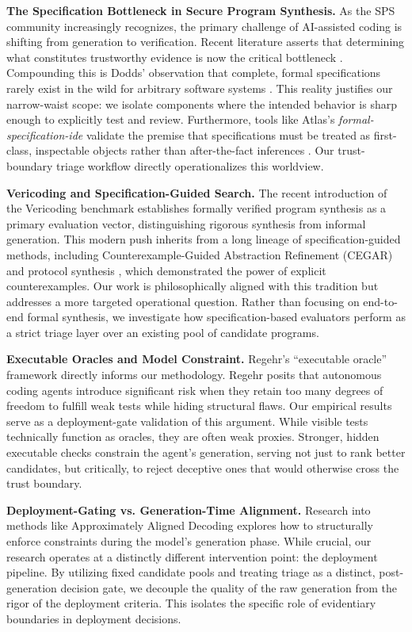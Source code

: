 \documentclass[11pt]{article}
\begin{document}
\textbf{The Specification Bottleneck in Secure Program Synthesis.}
As the SPS community increasingly recognizes, the primary challenge of AI-assisted coding is shifting from generation to verification. Recent literature asserts that determining what constitutes trustworthy evidence is now the critical bottleneck \cite{VonHippel2026SPS, Dougherty2026SPSSequence}. Compounding this is Dodds' observation that complete, formal specifications rarely exist in the wild for arbitrary software systems \cite{Dodds2025Specs}. This reality justifies our narrow-waist scope: we isolate components where the intended behavior is sharp enough to explicitly test and review. Furthermore, tools like Atlas's \textit{formal-specification-ide} validate the premise that specifications must be treated as first-class, inspectable objects rather than after-the-fact inferences \cite{Atlas2026SpecIDE}. Our trust-boundary triage workflow directly operationalizes this worldview.

\textbf{Vericoding and Specification-Guided Search.}
The recent introduction of the Vericoding benchmark \cite{Bursuc2025Vericoding} establishes formally verified program synthesis as a primary evaluation vector, distinguishing rigorous synthesis from informal generation. This modern push inherits from a long lineage of specification-guided methods, including Counterexample-Guided Abstraction Refinement (CEGAR) \cite{Clarke2003CEGAR} and protocol synthesis \cite{Alur2014Protocols}, which demonstrated the power of explicit counterexamples. Our work is philosophically aligned with this tradition but addresses a more targeted operational question. Rather than focusing on end-to-end formal synthesis, we investigate how specification-based evaluators perform as a strict triage layer over an existing pool of candidate programs.

\textbf{Executable Oracles and Model Constraint.}
Regehr's ``executable oracle'' framework \cite{Regehr2026ZeroDOF} directly informs our methodology. Regehr posits that autonomous coding agents introduce significant risk when they retain too many degrees of freedom to fulfill weak tests while hiding structural flaws. Our empirical results serve as a deployment-gate validation of this argument. While visible tests technically function as oracles, they are often weak proxies. Stronger, hidden executable checks constrain the agent's generation, serving not just to rank better candidates, but critically, to reject deceptive ones that would otherwise cross the trust boundary.

\textbf{Deployment-Gating vs. Generation-Time Alignment.}
Research into methods like Approximately Aligned Decoding \cite{Melcer2024AprAD} explores how to structurally enforce constraints during the model's generation phase. While crucial, our research operates at a distinctly different intervention point: the deployment pipeline. By utilizing fixed candidate pools and treating triage as a distinct, post-generation decision gate, we decouple the quality of the raw generation from the rigor of the deployment criteria. This isolates the specific role of evidentiary boundaries in deployment decisions.
\end{document}
